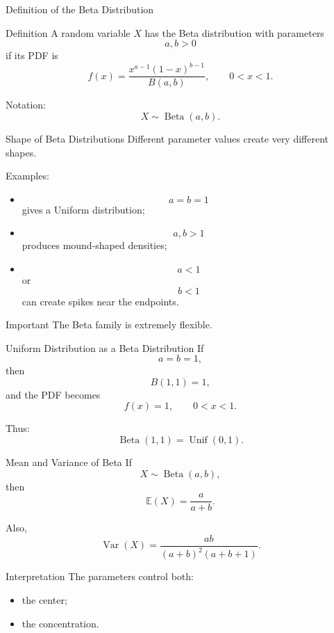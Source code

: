 \begin{frame}{Definition of the Beta Distribution}
\begin{keybox}{Definition}
A random variable $X$ has the Beta distribution with parameters
\[
a,b>0
\]
if its PDF is
\[
{
f(x)
=
\frac{
x^{a-1}(1-x)^{b-1}
}{
B(a,b)
},
\qquad 0<x<1.
}
\]

Notation:
\[
X\sim \operatorname{Beta}(a,b).
\]
\end{keybox}
\end{frame}

\begin{frame}{Shape of Beta Distributions}
Different parameter values create very different shapes.

\vspace{0.25cm}

Examples:
\begin{itemize}
    \item
    \[
    a=b=1
    \]
    gives a Uniform distribution;

    \item
    \[
    a,b>1
    \]
    produces mound-shaped densities;

    \item
    \[
    a<1
    \]
    or
    \[
    b<1
    \]
    can create spikes near the endpoints.
\end{itemize}

\vspace{0.25cm}

\begin{keybox}{Important}
The Beta family is extremely flexible.
\end{keybox}
\end{frame}

\begin{frame}{Uniform Distribution as a Beta Distribution}
If
\[
a=b=1,
\]
then
\[
B(1,1)=1,
\]
and the PDF becomes
\[
f(x)=1,
\qquad 0<x<1.
\]

Thus:
\[
{
\operatorname{Beta}(1,1)
=
\operatorname{Unif}(0,1).
}
\]
\end{frame}

\begin{frame}{Mean and Variance of Beta}
If
\[
X\sim \operatorname{Beta}(a,b),
\]
then
\[
{
\mathbb{E}(X)
=
\frac{a}{a+b}.
}
\]

Also,
\[
{
\operatorname{Var}(X)
=
\frac{ab}{(a+b)^2(a+b+1)}.
}
\]

\vspace{0.25cm}

\begin{keybox}{Interpretation}
The parameters control both:
\begin{itemize}
    \item the center;
    \item the concentration.
\end{itemize}
\end{keybox}
\end{frame}

